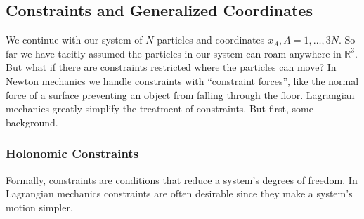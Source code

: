 \documentclass[11pt, a4paper]{article}
\begin{document}
\subsection{Constraints and Generalized Coordinates}
We continue with our system of $ N $ particles and coordinates $ x_{A}, A = 1, \ldots, 3N $. So far we have tacitly assumed the particles in our system can roam anywhere in $ \mathbb{R}^{3} $. But what if there are constraints restricted where the particles can move? In Newton mechanics we handle constraints with ``constraint forces'', like the normal force of a surface preventing an object from falling through the floor. Lagrangian mechanics greatly simplify the treatment of constraints. But first, some background.

\subsubsection{Holonomic Constraints} \label{sssec:lag:hol_const}
Formally, constraints are conditions that reduce a system's degrees of freedom. In Lagrangian mechanics constraints are often desirable since they make a system's motion simpler.
\end{document}
